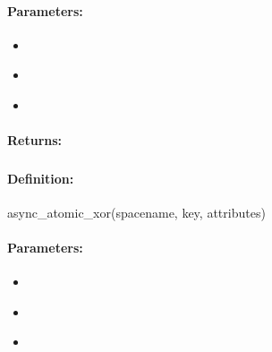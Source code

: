 \paragraph{Parameters:}
\begin{itemize}[noitemsep]
\item {}\\

\item {}\\

\item {}\\

\end{itemize}

\paragraph{Returns:}


\pagebreak
\subsubsection{}
\label{api:ruby:async_atomic_xor}


\paragraph{Definition:}
\begin{rubycode}
async_atomic_xor(spacename, key, attributes)
\end{rubycode}

\paragraph{Parameters:}
\begin{itemize}[noitemsep]
\item {}\\

\item {}\\

\item {}\\

\end{itemize}

